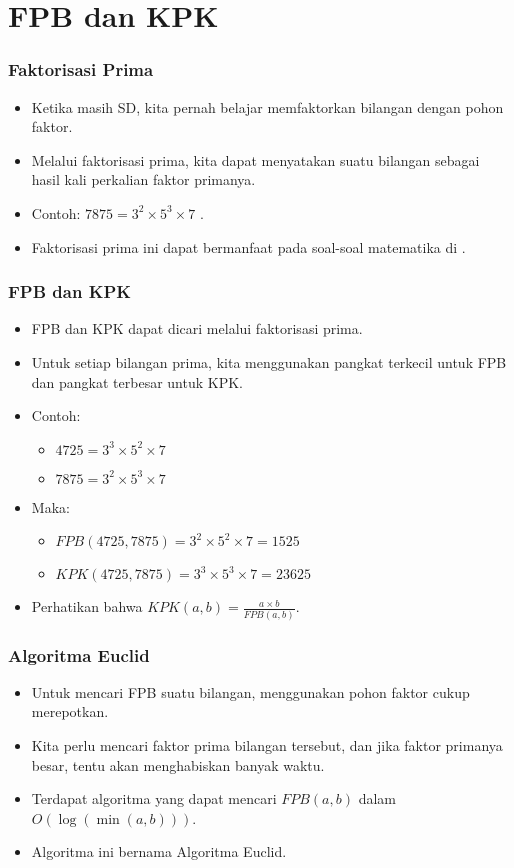 \section{FPB dan KPK}
\frame{\sectionpage}

\begin{frame}
\frametitle{Faktorisasi Prima}
\begin{itemize}
  \item Ketika masih SD, kita pernah belajar memfaktorkan bilangan dengan pohon faktor.
  \item Melalui faktorisasi prima, kita dapat menyatakan suatu bilangan sebagai hasil kali perkalian faktor primanya.
  \item Contoh: $7875 = 3^{2} \times 5^{3} \times 7$ .
  \item Faktorisasi prima ini dapat bermanfaat pada soal-soal matematika di .
\end{itemize}
\end{frame}

\begin{frame}
\frametitle{FPB dan KPK}
\begin{itemize}
  \item FPB dan KPK dapat dicari melalui faktorisasi prima. 
  \item Untuk setiap bilangan prima, kita menggunakan pangkat terkecil untuk FPB dan pangkat terbesar untuk KPK.
  \item Contoh:
  \begin{itemize}
    \item $4725 = 3^{3} \times 5^{2} \times 7$
    \item $7875 = 3^{2} \times 5^{3} \times 7$
  \end{itemize}
  \item Maka: 
  \begin{itemize}
    \item $FPB(4725,7875) = 3^{2} \times 5^{2} \times 7 = 1525$
    \item $KPK(4725,7875) = 3^{3} \times 5^{3} \times 7 = 23625$
    \newline
  \end{itemize}
  \item Perhatikan bahwa $KPK(a,b) = \frac{a \times b}{FPB(a,b)}$. 
\end{itemize}
\end{frame}

\begin{frame}
\frametitle{Algoritma Euclid}
\begin{itemize}
  \item Untuk mencari FPB suatu bilangan, menggunakan pohon faktor cukup merepotkan.
  \item Kita perlu mencari faktor prima bilangan tersebut, dan jika faktor primanya besar, tentu akan menghabiskan banyak waktu.
  \item Terdapat algoritma yang dapat mencari $FPB(a,b)$ dalam $O(\log{(\min{(a,b)})})$.
  \item Algoritma ini bernama Algoritma Euclid.
\end{itemize}
\end{frame}

